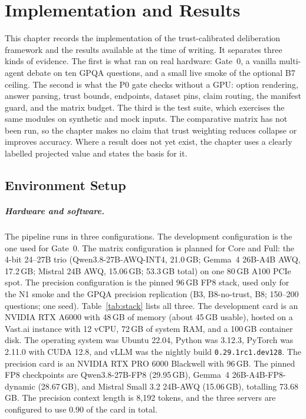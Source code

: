 \chapter{Implementation and Results}\label{chapter:implementation}

This chapter records the implementation of the trust-calibrated deliberation framework and the results available at the time of writing. It separates three kinds of evidence. The first is what ran on real hardware: Gate~0, a vanilla multi-agent debate on ten GPQA questions, and a small live smoke of the optional B7 ceiling. The second is what the P0 gate checks without a GPU: option rendering, answer parsing, trust bounds, endpoints, dataset pins, claim routing, the manifest guard, and the matrix budget. The third is the test suite, which exercises the same modules on synthetic and mock inputs. The comparative matrix has not been run, so the chapter makes no claim that trust weighting reduces collapse or improves accuracy. Where a result does not yet exist, the chapter uses a clearly labelled projected value and states the basis for it.

\section{Environment Setup}\label{sec:environment-setup}

\paragraph*{Hardware and software.}
The pipeline runs in three configurations. The development configuration is the one used for Gate~0. The matrix configuration is planned for Core and Full: the 4-bit 24--27B trio (Qwen3.8-27B-AWQ-INT4, 21.0\,GB; Gemma~4 26B-A4B AWQ, 17.2\,GB; Mistral 24B AWQ, 15.06\,GB; 53.3\,GB total) on one 80\,GB A100 PCIe spot. The precision configuration is the pinned 96\,GB FP8 stack, used only for the N1 smoke and the GPQA precision replication (B3, B8-no-trust, B8; 150--200 questions; one seed). Table~\ref{tab:stack} lists all three. The development card is an NVIDIA RTX A6000 with 48\,GB of memory (about 45\,GB usable), hosted on a Vast.ai instance with 12 vCPU, 72\,GB of system RAM, and a 100\,GB container disk. The operating system was Ubuntu 22.04, Python was 3.12.3, PyTorch was 2.11.0 with CUDA 12.8, and vLLM was the nightly build \texttt{0.29.1rc1.dev128}. The precision card is an NVIDIA RTX PRO 6000 Blackwell with 96\,GB. The pinned FP8 checkpoints are Qwen3.8-27B-FP8 (29.95\,GB), Gemma~4 26B-A4B-FP8-dynamic (28.67\,GB), and Mistral Small 3.2 24B-AWQ (15.06\,GB), totalling 73.68\,GB. The precision context length is 8{,}192 tokens, and the three servers are configured to use 0.90 of the card in total.


